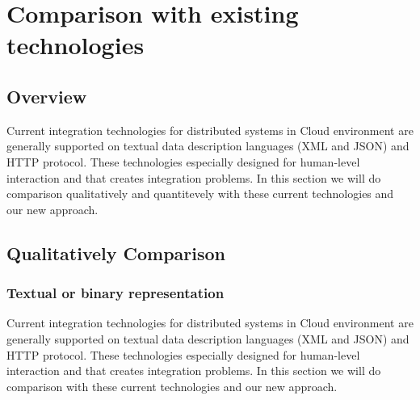 


\chapter{Comparison with existing technologies}
\label{chapter:comparison}


\section{Overview}
\label{section:overview}

Current integration technologies for distributed systems in Cloud environment are generally supported on
textual data description languages (XML and JSON) and HTTP protocol.
These technologies especially designed for human-level interaction and that creates integration problems.
In this section we will do comparison qualitatively and quantitevely with these current technologies and our new approach.


\section{Qualitatively Comparison}
\subsection{Textual or binary representation}
\label{section:textualbinary}
Current integration technologies for distributed systems in Cloud environment are generally supported on
textual data description languages (XML and JSON) and HTTP protocol.
These technologies especially designed for human-level interaction and that creates integration problems.
In this section we will do comparison with these current technologies and our new approach.\\

